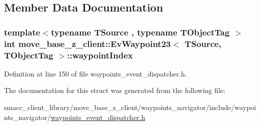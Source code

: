 \subsection{Member Data Documentation}
\subsubsection[{\texorpdfstring{waypoint\+Index}{waypointIndex}}]{\setlength{\rightskip}{0pt plus 5cm}template$<$typename T\+Source , typename T\+Object\+Tag $>$ int {\bf move\+\_\+base\+\_\+z\+\_\+client\+::\+Ev\+Waypoint23}$<$ T\+Source, T\+Object\+Tag $>$\+::waypoint\+Index}\hypertarget{structmove__base__z__client_1_1EvWaypoint23_a97dd521f5395cfd7b5cc4bb84ece442e}{}\label{structmove__base__z__client_1_1EvWaypoint23_a97dd521f5395cfd7b5cc4bb84ece442e}


Definition at line 150 of file waypoints\+\_\+event\+\_\+dispatcher.\+h.



The documentation for this struct was generated from the following file\+:\begin{DoxyCompactItemize}
\item 
smacc\+\_\+client\+\_\+library/move\+\_\+base\+\_\+z\+\_\+client/waypoints\+\_\+navigator/include/waypoints\+\_\+navigator/\hyperlink{waypoints__event__dispatcher_8h}{waypoints\+\_\+event\+\_\+dispatcher.\+h}\end{DoxyCompactItemize}
